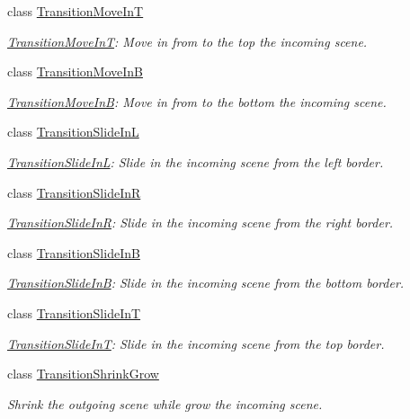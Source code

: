 \begin{DoxyCompactItemize}
class \hyperlink{classTransitionMoveInT}{Transition\+Move\+InT}
\begin{DoxyCompactList}\small\item\em \hyperlink{classTransitionMoveInT}{Transition\+Move\+InT}\+: Move in from to the top the incoming scene. \end{DoxyCompactList}\item 
class \hyperlink{classTransitionMoveInB}{Transition\+Move\+InB}
\begin{DoxyCompactList}\small\item\em \hyperlink{classTransitionMoveInB}{Transition\+Move\+InB}\+: Move in from to the bottom the incoming scene. \end{DoxyCompactList}\item 
class \hyperlink{classTransitionSlideInL}{Transition\+Slide\+InL}
\begin{DoxyCompactList}\small\item\em \hyperlink{classTransitionSlideInL}{Transition\+Slide\+InL}\+: Slide in the incoming scene from the left border. \end{DoxyCompactList}\item 
class \hyperlink{classTransitionSlideInR}{Transition\+Slide\+InR}
\begin{DoxyCompactList}\small\item\em \hyperlink{classTransitionSlideInR}{Transition\+Slide\+InR}\+: Slide in the incoming scene from the right border. \end{DoxyCompactList}\item 
class \hyperlink{classTransitionSlideInB}{Transition\+Slide\+InB}
\begin{DoxyCompactList}\small\item\em \hyperlink{classTransitionSlideInB}{Transition\+Slide\+InB}\+: Slide in the incoming scene from the bottom border. \end{DoxyCompactList}\item 
class \hyperlink{classTransitionSlideInT}{Transition\+Slide\+InT}
\begin{DoxyCompactList}\small\item\em \hyperlink{classTransitionSlideInT}{Transition\+Slide\+InT}\+: Slide in the incoming scene from the top border. \end{DoxyCompactList}\item 
class \hyperlink{classTransitionShrinkGrow}{Transition\+Shrink\+Grow}
\begin{DoxyCompactList}\small\item\em Shrink the outgoing scene while grow the incoming scene. \end{DoxyCompactList}\item 

\end{DoxyCompactItemize}
